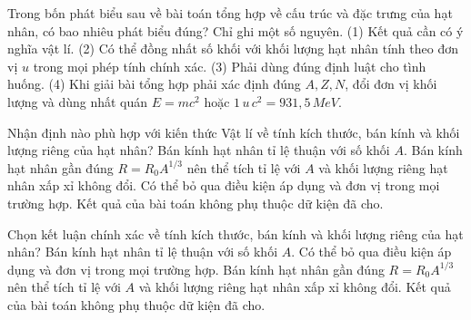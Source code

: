 \begin{ex}
Trong bốn phát biểu sau về bài toán tổng hợp về cấu trúc và đặc trưng của hạt nhân, có bao nhiêu phát biểu đúng? Chỉ ghi một số nguyên. (1) Kết quả cần có ý nghĩa vật lí. (2) Có thể đồng nhất số khối với khối lượng hạt nhân tính theo đơn vị $u$ trong mọi phép tính chính xác. (3) Phải dùng đúng định luật cho tình huống. (4) Khi giải bài tổng hợp phải xác định đúng $A,Z,N$, đổi đơn vị khối lượng và dùng nhất quán $E=mc^2$ hoặc $1\,u\,c^2=931,5\,MeV$.
\end{ex}

\begin{ex}
Nhận định nào phù hợp với kiến thức Vật lí về tính kích thước, bán kính và khối lượng riêng của hạt nhân?
\choice
{Bán kính hạt nhân tỉ lệ thuận với số khối $A$.}
{\True Bán kính hạt nhân gần đúng $R=R_0A^{1/3}$ nên thể tích tỉ lệ với $A$ và khối lượng riêng hạt nhân xấp xỉ không đổi.}
{Có thể bỏ qua điều kiện áp dụng và đơn vị trong mọi trường hợp.}
{Kết quả của bài toán không phụ thuộc dữ kiện đã cho.}
\end{ex}

\begin{ex}
Chọn kết luận chính xác về tính kích thước, bán kính và khối lượng riêng của hạt nhân?
\choice
{Bán kính hạt nhân tỉ lệ thuận với số khối $A$.}
{Có thể bỏ qua điều kiện áp dụng và đơn vị trong mọi trường hợp.}
{\True Bán kính hạt nhân gần đúng $R=R_0A^{1/3}$ nên thể tích tỉ lệ với $A$ và khối lượng riêng hạt nhân xấp xỉ không đổi.}
{Kết quả của bài toán không phụ thuộc dữ kiện đã cho.}
\end{ex}

